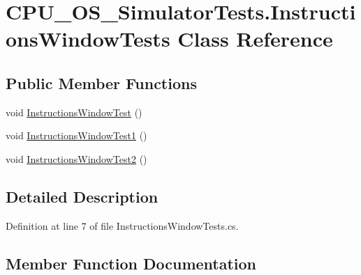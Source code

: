 \hypertarget{class_c_p_u___o_s___simulator_tests_1_1_instructions_window_tests}{}\section{C\+P\+U\+\_\+\+O\+S\+\_\+\+Simulator\+Tests.\+Instructions\+Window\+Tests Class Reference}
\label{class_c_p_u___o_s___simulator_tests_1_1_instructions_window_tests}
\subsection*{Public Member Functions}
\begin{DoxyCompactItemize}
\item 
void \hyperlink{class_c_p_u___o_s___simulator_tests_1_1_instructions_window_tests_ae8eed54ffd9c36cf42565e3f59f0d75b}{Instructions\+Window\+Test} ()
\item 
void \hyperlink{class_c_p_u___o_s___simulator_tests_1_1_instructions_window_tests_a7c9bbfd4ea59118f37a41465c776d401}{Instructions\+Window\+Test1} ()
\item 
void \hyperlink{class_c_p_u___o_s___simulator_tests_1_1_instructions_window_tests_ade450016c96d299a5f76deb7414979c3}{Instructions\+Window\+Test2} ()
\end{DoxyCompactItemize}


\subsection{Detailed Description}


Definition at line 7 of file Instructions\+Window\+Tests.\+cs.



\subsection{Member Function Documentation}
\hypertarget{class_c_p_u___o_s___simulator_tests_1_1_instructions_window_tests_ae8eed54ffd9c36cf42565e3f59f0d75b}{}
